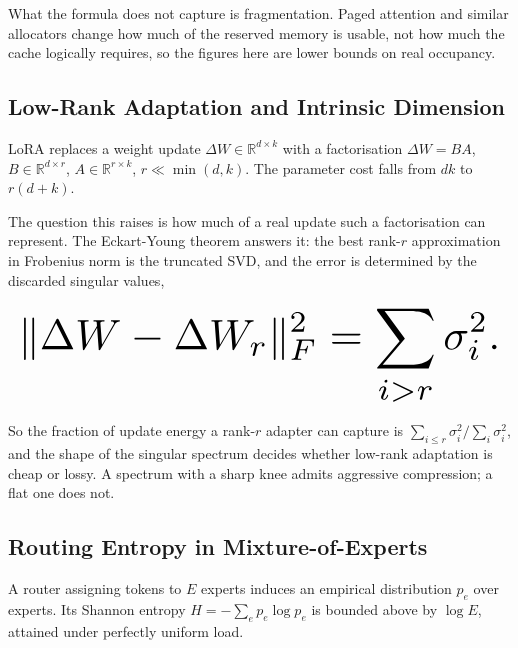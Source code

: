 \documentclass[10pt,journal,compsoc,twocolumn]{IEEEtran}
\begin{document}
What the formula does not capture is fragmentation. Paged attention and similar allocators change how much of the reserved memory is usable, not how much the cache logically requires, so the figures here are lower bounds on real occupancy.


\subsection{Low-Rank Adaptation and Intrinsic Dimension}


LoRA replaces a weight update $\Delta W \in \mathbb{R}^{d \times k}$ with a factorisation $\Delta W = BA$, $B \in \mathbb{R}^{d \times r}$, $A \in \mathbb{R}^{r \times k}$, $r \ll \min(d, k)$. The parameter cost falls from $dk$ to $r(d + k)$.

The question this raises is how much of a real update such a factorisation can represent. The Eckart-Young theorem answers it: the best rank-$r$ approximation in Frobenius norm is the truncated SVD, and the error is determined by the discarded singular values,










\begin{equation}
\resizebox{\columnwidth}{!}{$\displaystyle
\begin{aligned}
\|\Delta W - \Delta W_r\|_F^2 = \sum_{i > r} \sigma_i^2 .
\end{aligned}
$}
\end{equation}










So the fraction of update energy a rank-$r$ adapter can capture is $\sum_{i \le r} \sigma_i^2 / \sum_i \sigma_i^2$, and the shape of the singular spectrum decides whether low-rank adaptation is cheap or lossy. A spectrum with a sharp knee admits aggressive compression; a flat one does not.


\subsection{Routing Entropy in Mixture-of-Experts}


A router assigning tokens to $E$ experts induces an empirical distribution $p_e$ over experts. Its Shannon entropy $H = -\sum_e p_e \log p_e$ is bounded above by $\log E$, attained under perfectly uniform load.
\end{document}
